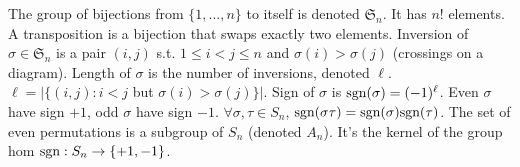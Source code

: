  The group of bijections from
$\{1, ..., n\}$ to itself is denoted $\mathfrak{S}_n$.
It has $n!$ elements.
A transposition is a bijection that swaps exactly two elements.
 Inversion of $\sigma \in \mathfrak{S}_n$ is a pair $(i, j)$
s.t. $1 \le i < j \le n$ and $\sigma(i) > \sigma(j)$ (crossings on a diagram).
Length of $\sigma$ is the number of inversions, denoted $\ell$.
$\ell = |\{(i, j) : i < j$ but $\sigma(i) > \sigma(j)\}|$.
Sign of $\sigma$ is $\text{sgn}(\sigma) = (-1)^{\ell}$.
Even $\sigma$ have sign $+1$, odd $\sigma$ have sign $-1$.
$\forall \sigma, \tau \in S_n$, $\text{sgn}(\sigma \tau) = \text{sgn}(\sigma) \text{sgn}(\tau)$.
The set of even permutations is a subgroup of $S_n$ (denoted $A_n$).
It's the kernel of the group hom $\text{sgn} : S_n \to \{+1, -1\}$.
